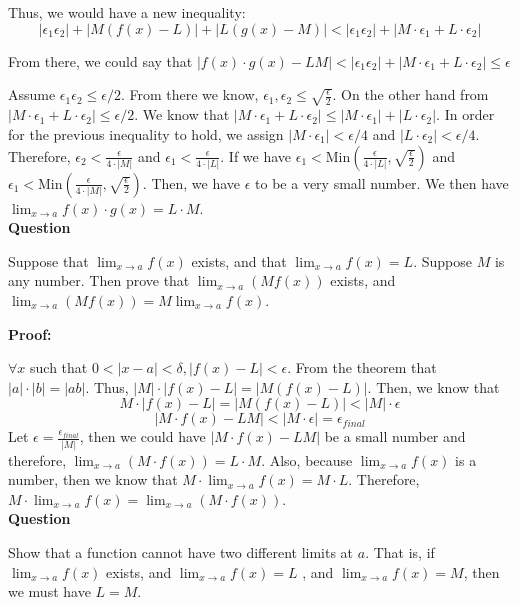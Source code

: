 \documentclass[a4paper,12pt]{report}
\begin{document}
\noindent
Thus, we would have a new inequality:
\[|\epsilon_1\epsilon_2|+|M(f(x)-L)|+|L(g(x)-M)|<|\epsilon_1\epsilon_2|+|M\cdot{\epsilon_1}+L\cdot{\epsilon_2}|\]

\noindent
From there, we could say that $|f(x)\cdot{g(x)}-LM|<|\epsilon_1\epsilon_2|+|M\cdot{\epsilon_1}+L\cdot{\epsilon_2}|\leq \epsilon$

\noindent
Assume $\epsilon_1\epsilon_2\leq \epsilon/2$. From there we know, $\epsilon_1, \epsilon_2 \leq \sqrt{\frac{\epsilon}{2}}$. On the other hand from $|M\cdot{\epsilon_1}+L\cdot{\epsilon_2}|\leq \epsilon/2$. We know that $|M\cdot{\epsilon_1}+L\cdot{\epsilon_2}|\leq |M\cdot{\epsilon_1}|+|L\cdot{\epsilon_2}|$. In order for the previous inequality to hold, we assign $|M\cdot{\epsilon_1}|<\epsilon/4$ and $|L\cdot{\epsilon_2}|<\epsilon/4$. Therefore, $\epsilon_2<\frac{\epsilon}{4\cdot{|M|}}$ and $\epsilon_1<\frac{\epsilon}{4\cdot{|L|}}$. If we have $\epsilon_1<\text{Min}(\frac{\epsilon}{4\cdot{|L|}}, \sqrt{\frac{\epsilon}{2}})$ and $\epsilon_1<\text{Min}(\frac{\epsilon}{4\cdot{|M|}}, \sqrt{\frac{\epsilon}{2}})$. Then, we have $\epsilon$ to be a very small number. We then have $\lim_{x\to a} f(x)\cdot{g(x)}=L\cdot{M}$.\\

\noindent
\textbf{Question}

\noindent
Suppose that $\displaystyle{\lim_{x\to a}}f(x)$
exists, and that
$\displaystyle{\lim_{x\to a}}f(x)=L$. Suppose $M$ is any 
number.
Then prove that $\displaystyle{\lim_{x\to a}}(Mf(x))$
exists, and $\displaystyle{\lim_{x\to a}}(Mf(x))=M\displaystyle{\lim_{x\to a}}f(x)$.

\noindent
\textbf{Proof: }

\noindent
$\forall x $ such that $0<|x-a|<\delta, |f(x)-L|< \epsilon$. From the theorem that $|a|\cdot{|b|}=|ab|$. Thus, $|M|\cdot{|f(x)-L|}=|M(f(x)-L)|$. Then, we know that 
\[M\cdot{|f(x)-L|}=|M(f(x)-L)|<|M|\cdot{\epsilon}\]
\[|M\cdot{f(x)}-LM|<|M\cdot{\epsilon}|=\epsilon_{final}\]
Let $\epsilon=\frac{\epsilon_{final}}{|M|}$, then we could have $|M\cdot{f(x)}-LM|$ be a small number and therefore, $\lim_{x\to a}(M\cdot{f(x)})=L\cdot{M}$. Also, because $\lim_{x\to a}f(x)$ is a number, then we know that $M\cdot{\lim_{x\to a}f(x)}=M\cdot{L}$. Therefore, $M\cdot{\lim_{x\to a}f(x)}=\lim_{x\to a}(M\cdot{f(x)})$.\\

\noindent
\textbf{Question}

\noindent
Show that a function cannot
have two different limits at $a$. That is, 
if $\displaystyle{\lim_{x\to a}}f(x)$ exists, and 
$\displaystyle{\lim_{x\to a}}f(x)=L$ , and
$\displaystyle{\lim_{x\to a}}f(x)=M$, then we
must have $L=M$.
\end{document}
